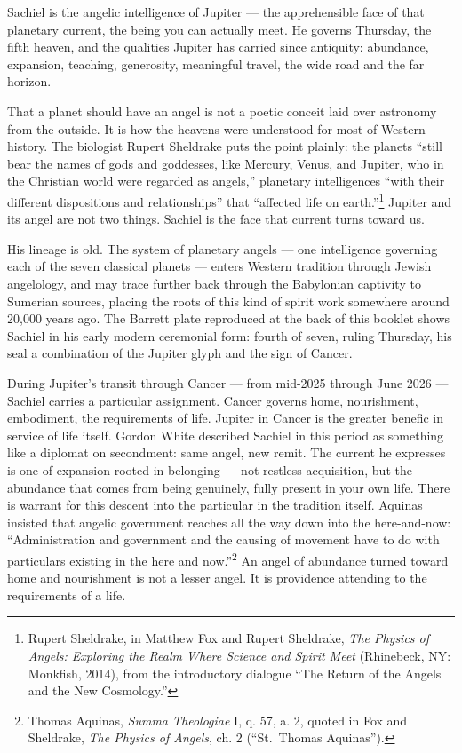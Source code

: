 \documentclass[10pt,openany]{book}
\begin{document}
{\normalsize

\noindent Sachiel is the angelic intelligence of Jupiter --- the apprehensible face of that
planetary current, the being you can actually meet. He governs Thursday, the fifth heaven,
and the qualities Jupiter has carried since antiquity: abundance, expansion, teaching,
generosity, meaningful travel, the wide road and the far horizon.

\vspace{6pt}
\noindent That a planet should have an angel is not a poetic conceit laid over astronomy from
the outside. It is how the heavens were understood for most of Western history. The biologist
Rupert Sheldrake puts the point plainly: the planets ``still bear the names of gods and
goddesses, like Mercury, Venus, and Jupiter, who in the Christian world were regarded as
angels,'' planetary intelligences ``with their different dispositions and relationships''
that ``affected life on earth.''\footnote{Rupert Sheldrake, in Matthew Fox and Rupert
Sheldrake, \textit{The Physics of Angels: Exploring the Realm Where Science and Spirit Meet}
(Rhinebeck, NY: Monkfish, 2014), from the introductory dialogue ``The Return of the Angels
and the New Cosmology.''} Jupiter and its angel are not two things. Sachiel is the face that
current turns toward us.

\vspace{6pt}
\noindent His lineage is old. The system of planetary angels --- one intelligence governing
each of the seven classical planets --- enters Western tradition through Jewish angelology,
and may trace further back through the Babylonian captivity to Sumerian sources, placing the
roots of this kind of spirit work somewhere around 20,000 years ago. The Barrett plate
reproduced at the back of this booklet shows Sachiel in his early modern ceremonial form:
fourth of seven, ruling Thursday, his seal a combination of the Jupiter glyph and the sign
of Cancer.

\vspace{6pt}
\noindent During Jupiter's transit through Cancer --- from mid-2025 through June 2026 ---
Sachiel carries a particular assignment. Cancer governs home, nourishment, embodiment, the
requirements of life. Jupiter in Cancer is the greater benefic in service of life itself.
Gordon White described Sachiel in this period as something like a diplomat on secondment:
same angel, new remit. The current he expresses is one of expansion rooted in belonging ---
not restless acquisition, but the abundance that comes from being genuinely, fully present
in your own life. There is warrant for this descent into the particular in the tradition
itself. Aquinas insisted that angelic government reaches all the way down into the
here-and-now: ``Administration and government and the causing of movement have to do with
particulars existing in the here and now.''\footnote{Thomas Aquinas, \textit{Summa
Theologiae} I, q. 57, a. 2, quoted in Fox and Sheldrake, \textit{The Physics of Angels},
ch. 2 (``St.\ Thomas Aquinas'').} An angel of abundance turned toward home and nourishment
is not a lesser angel. It is providence attending to the requirements of a life.

}
\end{document}
